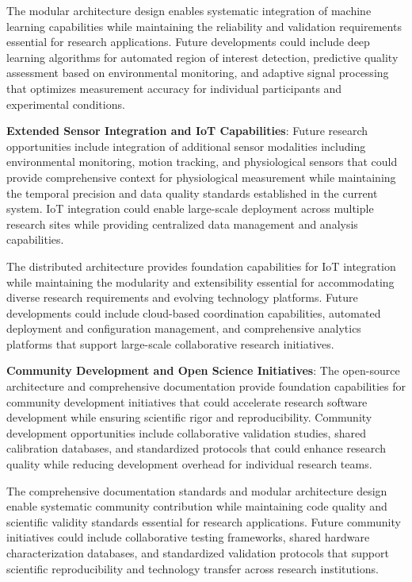 \documentclass[11pt,a4paper]{report}
\begin{document}
The modular architecture design enables systematic integration of machine learning capabilities while maintaining the
reliability and validation requirements essential for research applications. Future developments could include deep
learning algorithms for automated region of interest detection, predictive quality assessment based on environmental
monitoring, and adaptive signal processing that optimizes measurement accuracy for individual participants and
experimental conditions.

\textbf{Extended Sensor Integration and IoT Capabilities}: Future research opportunities include integration of additional
sensor modalities including environmental monitoring, motion tracking, and physiological sensors that could provide
comprehensive context for physiological measurement while maintaining the temporal precision and data quality standards
established in the current system. IoT integration could enable large-scale deployment across multiple research sites
while providing centralized data management and analysis capabilities.

The distributed architecture provides foundation capabilities for IoT integration while maintaining the modularity and
extensibility essential for accommodating diverse research requirements and evolving technology platforms. Future
developments could include cloud-based coordination capabilities, automated deployment and configuration management, and
comprehensive analytics platforms that support large-scale collaborative research initiatives.

\textbf{Community Development and Open Science Initiatives}: The open-source architecture and comprehensive documentation
provide foundation capabilities for community development initiatives that could accelerate research software
development while ensuring scientific rigor and reproducibility. Community development opportunities include
collaborative validation studies, shared calibration databases, and standardized protocols that could enhance research
quality while reducing development overhead for individual research teams.

The comprehensive documentation standards and modular architecture design enable systematic community contribution while
maintaining code quality and scientific validity standards essential for research applications. Future community
initiatives could include collaborative testing frameworks, shared hardware characterization databases, and standardized
validation protocols that support scientific reproducibility and technology transfer across research institutions.
\end{document}

